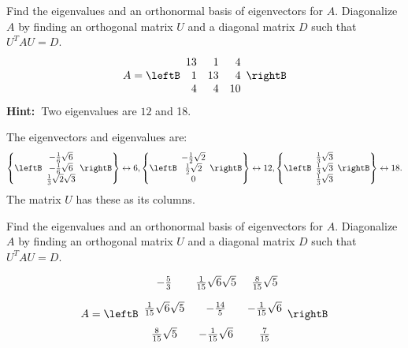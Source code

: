 \begin{enumialphparenastyle}
\begin{ex} Find the eigenvalues and an orthonormal basis of eigenvectors for $A.$
Diagonalize $A$ by finding an orthogonal matrix $U$ and a diagonal matrix $D$
such that $U^{T}AU=D$. 
\begin{equation*}
A=\leftB 
\begin{array}{rrr}
13 & 1 & 4 \\ 
1 & 13 & 4 \\ 
4 & 4 & 10
\end{array}
\rightB 
\end{equation*}
\textbf{Hint:\ }Two eigenvalues are $12$ and 18.
\begin{sol}
The eigenvectors and eigenvalues are:
\[
\left\{ \leftB
\begin{array}{c}
-\frac{1}{6}\sqrt{6} \\
-\frac{1}{6}\sqrt{6} \\
\frac{1}{3}\sqrt{2}\sqrt{3}
\end{array}
\rightB \right\} \leftrightarrow 6,\left\{ \leftB
\begin{array}{c}
-\frac{1}{2}\sqrt{2} \\
\frac{1}{2}\sqrt{2} \\
0
\end{array}
\rightB \right\} \leftrightarrow 12,\left\{ \leftB
\begin{array}{c}
\frac{1}{3}\sqrt{3} \\
\frac{1}{3}\sqrt{3} \\
\frac{1}{3}\sqrt{3}
\end{array}
\rightB \right\} \leftrightarrow 18.
\]
The matrix $U$ has these as its columns.
\end{sol}
\end{ex}

\begin{ex} Find the eigenvalues and an orthonormal basis of eigenvectors for $A.$
Diagonalize $A$ by finding an orthogonal matrix $U$ and a diagonal matrix $D$
such that $U^{T}AU=D$.

\begin{equation*}
A=\leftB 
\begin{array}{ccc}
-\vspace{0.05in}\frac{5}{3} & \vspace{0.05in}\frac{1}{15}\sqrt{6}\sqrt{5} & 
\vspace{0.05in}\frac{8}{15}\sqrt{5} \\ 
\vspace{0.05in}\frac{1}{15}\sqrt{6}\sqrt{5} & -\vspace{0.05in}\frac{14}{5} & 
-\vspace{0.05in}\frac{1}{15}\sqrt{6} \\ 
\vspace{0.05in}\frac{8}{15}\sqrt{5} & -\vspace{0.05in}\frac{1}{15}\sqrt{6} & 
\vspace{0.05in}\frac{7}{15}
\end{array} \rightB
\end{equation*}


\end{ex}
\end{enumialphparenastyle}
